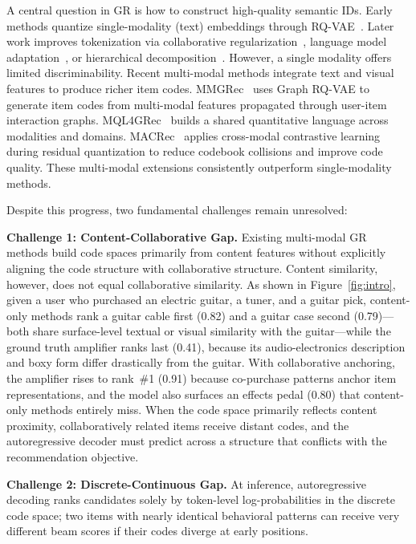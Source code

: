 \documentclass[sigconf, anonymous, review]{acmart}
\begin{document}
A central question in GR is how to construct high-quality semantic IDs.
%
Early methods quantize single-modality (text) embeddings through RQ-VAE~\cite{image_rqvae,tiger}.
%
Later work improves tokenization via collaborative regularization~\cite{letter}, language model adaptation~\cite{LCRec}, or hierarchical decomposition~\cite{cofirec}.
%
However, a single modality offers limited discriminability.
%
Recent multi-modal methods integrate text and visual features to produce richer item codes.
%
MMGRec~\cite{liu2024mmgrec} uses Graph RQ-VAE to generate item codes from multi-modal features propagated through user-item interaction graphs.
%
MQL4GRec~\cite{mql} builds a shared quantitative language across modalities and domains.
%
MACRec~\cite{macrec} applies cross-modal contrastive learning during residual quantization to reduce codebook collisions and improve code quality.
%
These multi-modal extensions consistently outperform single-modality methods.

Despite this progress, two fundamental challenges remain unresolved:

\noindent\textbf{Challenge 1: Content-Collaborative Gap.}
Existing multi-modal GR methods build code spaces primarily from content features without explicitly aligning the code structure with collaborative structure.
%
Content similarity, however, does not equal collaborative similarity.
%
As shown in Figure~\ref{fig:intro}, given a user who purchased an electric guitar, a tuner, and a guitar pick, content-only methods rank a guitar cable first (0.82) and a guitar case second (0.79)---both share surface-level textual or visual similarity with the guitar---while the ground truth amplifier ranks last (0.41), because its audio-electronics description and boxy form differ drastically from the guitar.
%
With collaborative anchoring, the amplifier rises to rank~\#1 (0.91) because co-purchase patterns anchor item representations, and the model also surfaces an effects pedal (0.80) that content-only methods entirely miss.
%
When the code space primarily reflects content proximity, collaboratively related items receive distant codes, and the autoregressive decoder must predict across a structure that conflicts with the recommendation objective.

\noindent\textbf{Challenge 2: Discrete-Continuous Gap.}
At inference, autoregressive decoding ranks candidates solely by token-level log-probabilities in the discrete code space; two items with nearly identical behavioral patterns can receive very different beam scores if their codes diverge at early positions.
\end{document}
